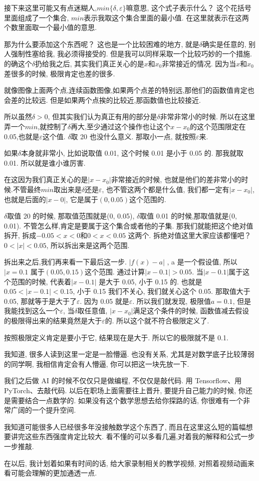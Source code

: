 接下来这里可能又有点迷糊人,$min\{\delta, \varepsilon\}$嘛意思, 这个式子表示什么？ 这个花括号里面组成了一个集合, $min$表示我取这个集合里面的最小值. 在这里就表示在这两个数里面取一个最小值的意思. 

那为什么要添加这个东西呢？ 这也是一个比较困难的地方, 就是$\delta$确实是任意的, 别人强制性塞给我, 我必须得接受的. 但是我可以同样采取一个比较巧妙的一个措施. 的确这个$\delta$扔给我之后, 其实我们真正关心的是$x$和$x_0$非常接近的情况. 因为当$x$和$x_0$差很多的时候, 极限肯定也差的很多. 

就像图像上面两个点,连续函数图像,如果两个点差的特别远,那他们的函数值肯定也会差的比较远. 但是如果两个点挨的比较近,那函数值也比较接近. 

所以虽然$\delta > 0$, 但其实我们认为真正有用的部分是$\delta$非常非常小的时候. 所以在这里弄一个$min$,就控制了$\delta$再大,至少通过这个操作也让这个$x-x_0$的这个范围限定在 0.05,也就是$\varepsilon$这个值. $\delta$取 20 也没什么意义. 那取小一点, 就按照$\varepsilon$来. 

如果$\delta$本身就非常小, 比如说取值 0.01, 这个时候 0.01 是小于 0.05 的. 那我就取 0.01. 所以就是谁小谁厉害. 

在这因为我们真正关心的是$|x-x_0|$非常接近的时候, 也就是他们的差非常小的时候.不管最终$min$取出来是$\delta$还是$\varepsilon$, 也不管这两个都是什么值, 我们都一定有$|x-x_0|$, 也就是后面的$|x-0|$, 它是属于$(0, 0.05)$这个范围的. 

$\delta$取值 20 的时候, 那取值范围就是(0, 0.05), $\delta$取值 0.01 的时候,那取值就是(0, 0.01). 不管怎么样,肯定是要属于这个集合或者他的子集. 那我们就能把这个绝对值拆开, 拆成$-0.05 < x <  0$和$0<x<0.05$ 这两个. 拆绝对值这里大家应该都懂吧？ $0< |x| < 0.05$, 所以拆出来是这两个范围. 

拆出来之后,我们再来看一下最后这一步. $|f(x)-a|$ , a 是一个假设值, 所以$|x=0.1$ 属于$(0.05, 0.15)$这个范围. 通过计算$|x-0.1| > 0.05$. 当$|x-0.1|$属于这个范围的时候, 代表着$|x-0.1|$ 是大于 0.05, 小于 0.15 的. 也就是$0.05 < |x-0.1| < 0.15$, 小于 0.15 我们不关心, 我们就关心这个 0.05. 那取值大于 0.05, 那就等于是大于了$\varepsilon$. 因为 0.05 就是$\varepsilon$. 所以我们就发现, 极限值$a=0.1$, 但是我能找到这么一个$\varepsilon$, 当$\delta$取任意值, $|x-x_0|$满足这个条件的时候,  函数值减去假设的极限得出来的结果竟然是大于$\varepsilon$的. 所以这个就不符合极限定义了. 

按照极限定义肯定是要小于它, 结果现在是大于. 所以它的极限就不是 0.1. 

我知道, 很多人读到这里一定是一脸懵逼. 也没有关系, 尤其是对数学底子比较薄弱的同学啊, 我相信肯定会有人懵逼, 你可以把这一块先放一下.

我们之后做 AI 的时候不仅仅只是做编程, 不仅仅是敲代码. 用 Tensorflow、用 PyTorch、去敲代码. 以后在职场上面需要往上晋升, 要提升自己能力的时候, 你还是需要结合一点数学的. 如果没有这个数学思想去给你探路的话, 你很难有一个非常广阔的一个提升空间. 

我知道可能很多人已经很多年没接触数学这个东西了, 而且在这里这么短的篇幅想要讲完这些东西强度肯定比较大. 看不懂的可以多看几遍,对着我的解释和公式一步一步推敲. 

在以后, 我计划着如果有时间的话, 给大家录制相关的教学视频, 对照着视频动画来看可能会理解的更加通透一点. 